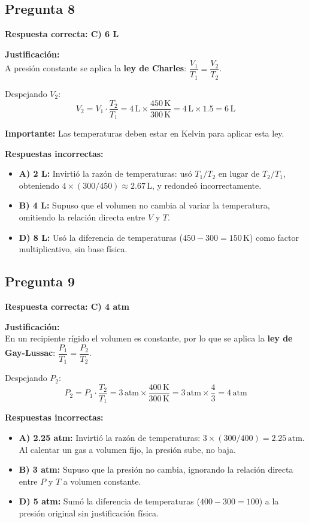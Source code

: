 \begin{respuestabox}
\subsection*{Pregunta 8}
\textcolor{verdecorrecto}{\textbf{Respuesta correcta: C) 6 L}}

\textbf{Justificación:}\\
A presión constante se aplica la \textbf{ley de Charles}: $\dfrac{V_1}{T_1} = \dfrac{V_2}{T_2}$.

Despejando $V_2$:
$$V_2 = V_1 \cdot \frac{T_2}{T_1} = 4\,\text{L} \times \frac{450\,\text{K}}{300\,\text{K}} = 4\,\text{L} \times 1.5 = 6\,\text{L}$$

\textbf{Importante:} Las temperaturas deben estar en Kelvin para aplicar esta ley.

\textbf{Respuestas incorrectas:}
\begin{itemize}
    \item \textbf{A) 2 L:} Invirtió la razón de temperaturas: usó $T_1/T_2$ en lugar de $T_2/T_1$, obteniendo $4 \times (300/450) \approx 2.67\,\text{L}$, y redondeó incorrectamente.
    \item \textbf{B) 4 L:} Supuso que el volumen no cambia al variar la temperatura, omitiendo la relación directa entre $V$ y $T$.
    \item \textbf{D) 8 L:} Usó la diferencia de temperaturas ($450 - 300 = 150\,\text{K}$) como factor multiplicativo, sin base física.
\end{itemize}
\end{respuestabox}

\begin{respuestabox}
\subsection*{Pregunta 9}
\textcolor{verdecorrecto}{\textbf{Respuesta correcta: C) 4 atm}}

\textbf{Justificación:}\\
En un recipiente rígido el volumen es constante, por lo que se aplica la \textbf{ley de Gay-Lussac}: $\dfrac{P_1}{T_1} = \dfrac{P_2}{T_2}$.

Despejando $P_2$:
$$P_2 = P_1 \cdot \frac{T_2}{T_1} = 3\,\text{atm} \times \frac{400\,\text{K}}{300\,\text{K}} = 3\,\text{atm} \times \frac{4}{3} = 4\,\text{atm}$$

\textbf{Respuestas incorrectas:}
\begin{itemize}
    \item \textbf{A) 2.25 atm:} Invirtió la razón de temperaturas: $3 \times (300/400) = 2.25\,\text{atm}$. Al calentar un gas a volumen fijo, la presión sube, no baja.
    \item \textbf{B) 3 atm:} Supuso que la presión no cambia, ignorando la relación directa entre $P$ y $T$ a volumen constante.
    \item \textbf{D) 5 atm:} Sumó la diferencia de temperaturas ($400 - 300 = 100$) a la presión original sin justificación física.
\end{itemize}
\end{respuestabox}

